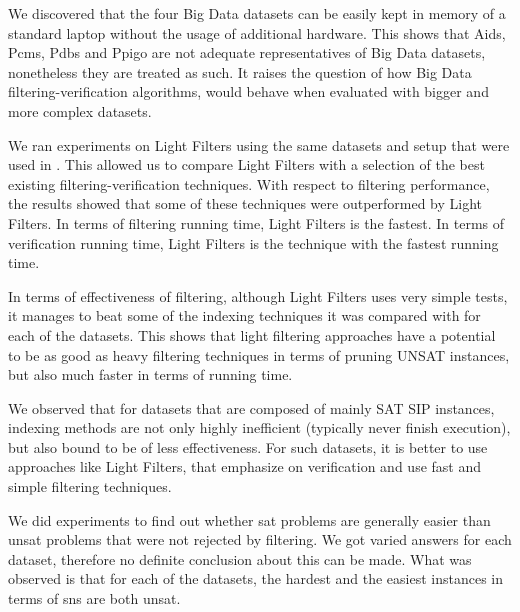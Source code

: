 \documentclass{l4proj}
\begin{document}
We discovered that the four Big Data datasets can be easily kept in memory of a standard laptop without the usage of additional hardware. This shows that Aids, Pcms, Pdbs and Ppigo are not adequate representatives of Big Data datasets, nonetheless they are treated as such. It raises the question of how Big Data filtering-verification algorithms, would behave when evaluated with bigger and more complex datasets.

We ran experiments on Light Filters using the same datasets and setup that were used in \cite{foteini}. This allowed us to compare Light Filters with a selection of the best existing filtering-verification techniques. With respect to filtering performance, the results showed that some of these techniques were outperformed by Light Filters. In terms of filtering running time, Light Filters is the fastest. In terms of verification running time, Light Filters is the technique with the fastest running time. 

In terms of effectiveness of filtering, although Light Filters uses very simple tests, it manages to beat some of the indexing techniques it was compared with for each of the datasets. This shows that light filtering approaches have a potential to be as good as heavy filtering techniques in terms of pruning UNSAT instances, but also much faster in terms of running time.

We observed that for datasets that are composed of mainly SAT SIP instances, indexing methods are not only highly inefficient (typically never finish execution), but also bound to be of less effectiveness. For such datasets, it is better to use approaches like Light Filters, that emphasize on verification and use fast and simple filtering techniques.


We did experiments to find out whether \gls{sat} problems are generally easier than \gls{unsat} problems that were not rejected by filtering. We got varied answers for each dataset, therefore no definite conclusion about this can be made. What was observed is that for each of the datasets, the hardest and the easiest instances in terms of \glspl{sn} are both \gls{unsat}.  
\end{document}
